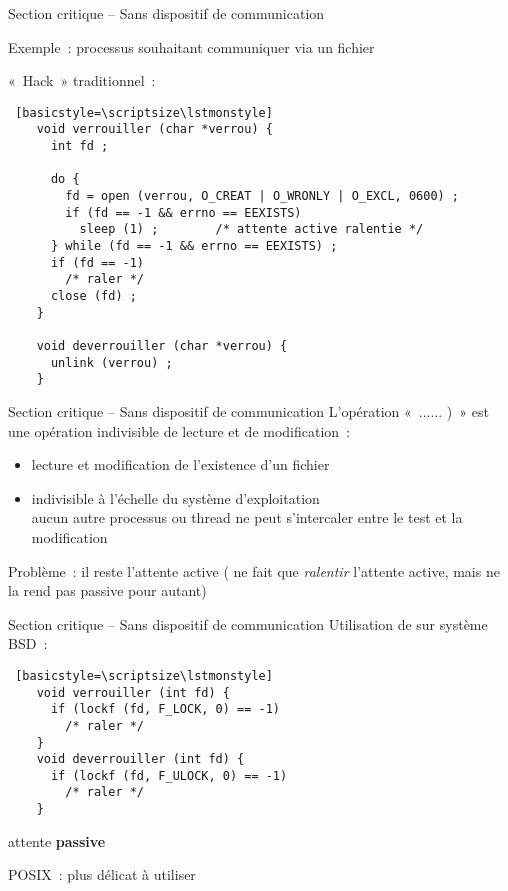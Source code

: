 \begin {frame} [fragile] {Section critique -- Sans dispositif de communication}

    Exemple~: processus souhaitant communiquer via un fichier

    \vspace* {3mm}

    «~Hack~» traditionnel~:

    \begin {lstlisting} [basicstyle=\scriptsize\lstmonstyle]
    void verrouiller (char *verrou) {
      int fd ;

      do {
        fd = open (verrou, O_CREAT | O_WRONLY | O_EXCL, 0600) ;
        if (fd == -1 && errno == EEXISTS)
          sleep (1) ;        /* attente active ralentie */
      } while (fd == -1 && errno == EEXISTS) ;
      if (fd == -1)
        /* raler */
      close (fd) ;
    }

    void deverrouiller (char *verrou) {
      unlink (verrou) ;
    }
    \end{lstlisting}

\end{frame}

\begin {frame} {Section critique -- Sans dispositif de communication}
    L'opération «~......\code
    {)}~» est une opération indivisible de lecture et de modification~:

    \begin {itemize}
	\item lecture et modification de l'existence d'un fichier
	\item indivisible à l'échelle du système d'exploitation \\
	    \implique aucun autre processus ou thread ne peut s'intercaler
	    entre le test et la modification

    \end {itemize}

    Problème~: il reste l'attente active
    ( ne fait que \emph {ralentir} l'attente active, mais ne
    la rend pas passive pour autant)

\end {frame}

\begin {frame} [fragile] {Section critique -- Sans dispositif de communication}
    Utilisation de  sur système BSD~:

    \begin {lstlisting} [basicstyle=\scriptsize\lstmonstyle]
    void verrouiller (int fd) {
      if (lockf (fd, F_LOCK, 0) == -1)
        /* raler */
    }
    void deverrouiller (int fd) {
      if (lockf (fd, F_ULOCK, 0) == -1)
        /* raler */
    }
    \end{lstlisting}

    \implique attente \textbf {passive}

    \vspace* {3mm}

    POSIX~:  plus délicat à utiliser
\end{frame}



